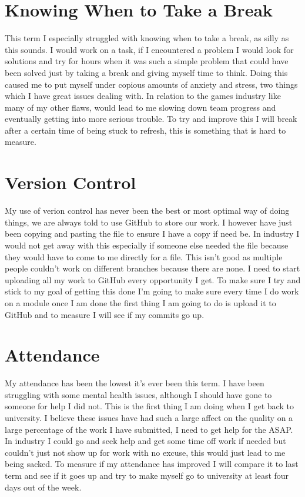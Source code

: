 \documentclass{scrartcl}
\begin{document}
\section{Knowing When to Take a Break}
This term I especially struggled with knowing when to take a break, as silly as this sounds. I would work on a task, if I encountered a problem I would look for solutions and try for hours when it was such a simple problem that could have been solved just by taking a break and giving myself time to think. Doing this caused me to put myself under copious amounts of anxiety and stress, two things which I have great issues dealing with. In relation to the games industry like many of my other flaws, would lead to me slowing down team progress and eventually getting into more serious trouble. To try and improve this I will break after a certain time of being stuck to refresh, this is something that is hard to measure.


\section{Version Control}
My use of verion control has never been the best or most optimal way of doing things, we are always told to use GitHub to store our work. I however have just been copying and pasting the file to ensure I have a copy if need be. In industry I would not get away with this especially if someone else needed the file because they would have to come to me directly for a file. This isn't good as multiple people couldn't work on different branches because there are none. I need to start uploading all my work to GitHub every opportunity I get. To make sure I try and stick to my goal of getting this done I'm going to make sure every time I do work on a module once I am done the first thing I am going to do is upload it to GitHub and to measure I will see if my commits go up.

\section{Attendance}
My attendance has been the lowest it's ever been this term. I have been struggling with some mental health issues, although I should have gone to someone for help I did not. This is the first thing I am doing when I get back to university. I believe these issues have had such a large affect on the quality on a large percentage of the work I have submitted, I need to get help for the ASAP. In industry I could go and seek help and get some time off work if needed but couldn't just not show up for work with no excuse, this would just lead to me being sacked. To measure if my attendance has improved I will compare it to last term and see if it goes up and try to make myself go to university at least four days out of the week.
\end{document}
